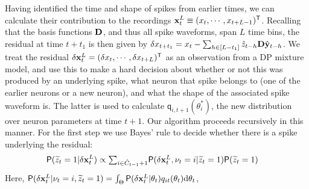 Having identified the time and shape of spikes from earlier times, we can calculate their contribution to the recordings 
$\mathbf{x}^L_t \equiv (x_{t},\cdots, x_{t+L-1})^{\mathsf{T}}$.
Recalling that the basis functions $\mathbf{D}$, and thus all spike waveforms, span $L$ time bins, the residual at time $t+t_1$ is then given by
$  \delta x_{t+t_1} = x_t - \sum_{h \in [L-t_1]} \hat{z}_{t-h} \mathbf{D}\hat{\mathbf{y}}_{t-h}$.
We treat the residual $\delta{\mathbf{x}}^L_{t} =  (\delta x_{t}, \cdots, \delta x_{t+L})^{\mathsf{T}}$ as an observation from a DP mixture model, and use this to make a hard decision about whether or not this was produced 
by an underlying spike, what neuron that spike belongs 
to (one of the earlier neurons or a new neuron), and what the shape of the associated spike waveform is. The latter is used to calculate
$\mathsf{q}_{i,t+1}(\theta^*_i)$, the new distribution over neuron parameters at time $t+1$. Our algorithm proceeds recursively in this manner. 
% 
% 
For the first step we use Bayes' rule to decide whether there is a spike underlying the residual:\vspace{-3pt}
\begin{align}
  \mathsf{P}(\mt{z}_t = 1 | \resx_t)  &\propto \textstyle{\sum}_{i \in \mh{C}_{t-1}+1} \mathsf{P}(\resx_t, {\nu_t = i} | \mt{z}_t = 1) \mathsf{P}(\mt{z}_t = 1) \label{eq:spk_prob}
\vspace{-5pt}
\end{align}
% 
Here, $ \mathsf{P}(\delta{\mathbf{x}}^L_t | {\nu_t = i} , \widetilde{z}_t = 1) = \int_{\Theta} \mathsf{P}(\delta{\mathbf{x}}^L_t | \theta_t) q_{it} (\theta_t) \mathrm{d} \theta_t$,
